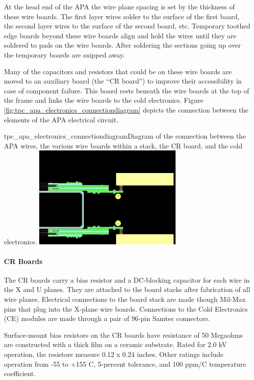 At the head end of the APA the wire plane spacing is set by the thickness of these wire boards.  The first layer wires solder to the surface of the first board, the second layer wires to the surface of the second board, etc.  Temporary toothed edge boards beyond these wire boards align and hold the wires until they are soldered to pads on the wire boards.  After soldering the sections going up over the temporary boards are snipped away.

Many of the capacitors and resistors that could be on these wire boards are moved to an auxiliary board (the ``CR board'') to improve their accessibility in case of component failure.  This board rests beneath the wire boards at the top of the frame and links the wire boards to the cold electronics.  Figure \ref{fig:tpc_apa_electronics_connectiondiagram} depicts the connection between the elements of the APA electrical circuit.

\begin{cdrfigure}{tpc_apa_electronics_connectiondiagram}{Diagram of the connection between the APA wires, the various wire boards within a stack, the CR board, and the cold electronics}.
\includegraphics[width=0.55\textwidth]{figures/tpc_apa_electronics_connectiondiagram.png}
\end{cdrfigure}

\paragraph{CR Boards}

The CR boards carry a bias resistor and a DC-blocking capacitor for each wire in the X and U planes. They are attached to the board stacks after fabrication of all wire planes.  Electrical connections to the board stack are made though Mil-Max pins that plug into the X-plane wire boards. Connections to the Cold Electronics (CE) modules are made through a pair of 96-pin Samtec connectors.

Surface-mount bias resistors on the CR boards have resistance of 50 Megaohms are constructed with a thick film on a ceramic substrate. Rated for 2.0 kV operation, the resistors measure 0.12 x 0.24 inches. Other ratings include operation from -55 to +155 C, 5-percent tolerance, and 100 ppm/C temperature coefficient.

